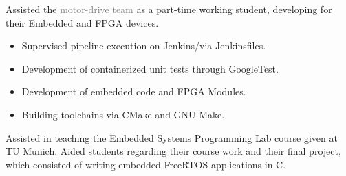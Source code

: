 \documentclass[10pt,a4paper,ragged2e,withhyper]{altacv}
\begin{document}
\begin{paracol}{2}
\divider

Assisted the \href{https://molabo.com/unternehmen/}{{\textcolor{gray}{\underline{motor-drive team}}}}
as a part-time working student, developing for their Embedded and FPGA devices.

\begin{itemize}
\item Supervised pipeline execution on Jenkins/via Jenkinsfiles.
\item Development of containerized unit tests through GoogleTest.
\item Development of embedded code and FPGA Modules.
\item Building toolchains via CMake and GNU Make.
\end{itemize}

\divider

Assisted in teaching the Embedded Systems Programming Lab course given at TU Munich.
Aided students regarding their course work and their final project, which 
consisted of writing embedded FreeRTOS applications in C.

\medskip

\nocite{*}

\switchcolumn


\\
\\
\\
\\
\\
\\
\\
\\
\\


\\


\end{paracol}
\end{document}
